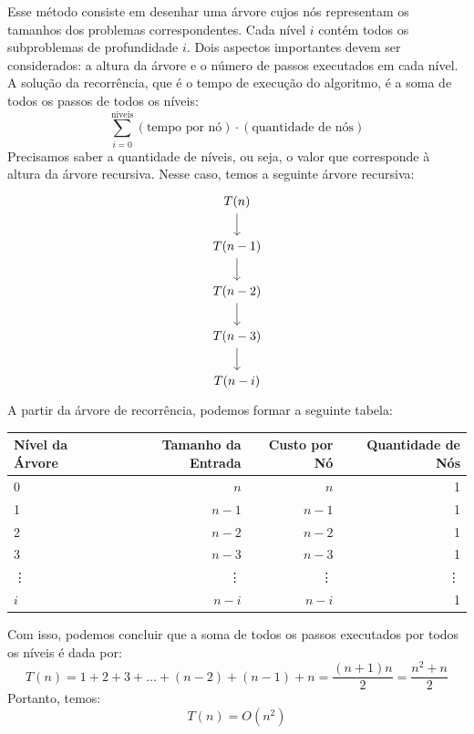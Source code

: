 \begin{enumerate}
	      Esse método consiste em desenhar uma árvore cujos nós representam os tamanhos dos problemas correspondentes. Cada nível \( i \) contém todos os subproblemas de profundidade \( i \). Dois aspectos importantes devem ser considerados: a altura da árvore e o número de passos executados em cada nível. A solução da recorrência, que é o tempo de execução do algoritmo, é a soma de todos os passos de todos os níveis:
	      \[
		      \sum_{i=0}^{\text{niveis}} (\text{tempo por nó}) \cdot (\text{quantidade de nós})
	      \]
	      Precisamos saber a quantidade de níveis, ou seja, o valor que corresponde à altura da árvore recursiva. Nesse caso, temos a seguinte árvore recursiva:
	      \[\begin{tikzcd}
			      {T(n)} \\
			      {T(n-1)} \\
			      {T(n-2)} \\
			      {T(n-3)} \\
			      {T(n-i)}
			      \arrow[from=1-1, to=2-1]
			      \arrow[from=2-1, to=3-1]
			      \arrow[from=3-1, to=4-1]
			      \arrow[from=4-1, to=5-1]
		      \end{tikzcd}\]
	      A partir da árvore de recorrência, podemos formar a seguinte tabela:
	      \begin{table}[h!]
		      \centering
		      \begin{tabular}{lrrr}
			      \toprule
			      Nível da Árvore & Tamanho da Entrada & Custo por Nó & Quantidade de Nós \\
			      \midrule
			      0               & \( n \)            & \( n \)      & 1                 \\
			      1               & \( n-1 \)          & \( n-1 \)    & 1                 \\
			      2               & \( n-2 \)          & \( n-2 \)    & 1                 \\
			      3               & \( n-3 \)          & \( n-3 \)    & 1                 \\
			      \vdots          & \vdots             & \vdots       & \vdots            \\
			      \( i \)         & \( n-i \)          & \( n-i \)    & 1                 \\
			      \bottomrule
		      \end{tabular}
	      \end{table}
	      \FloatBarrier
	      Com isso, podemos concluir que a soma de todos os passos executados por todos os níveis é dada por:
	      \[
		      T(n) = 1 + 2 + 3 + \ldots + (n - 2) + (n - 1) + n = \frac{(n + 1) n}{2} = \frac{n^2 + n}{2}
	      \]
	      Portanto, temos:
	      \[
		      T(n) = O(n^2)
	      \]
\end{enumerate}

